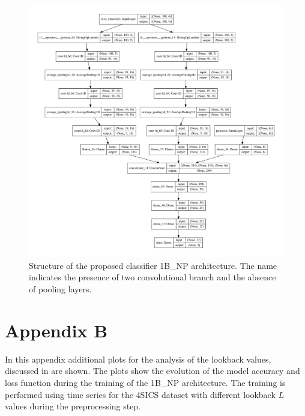 \begin{figure}
    \hspace{-2cm}\includegraphics[width=1.3\textwidth]{images/models/model_2bnp.pdf}
\caption{{Structure of the proposed classifier 1B\_NP architecture. The name indicates the presence of two convolutional branch and the absence of pooling layers.}}    \label{fig:2bnp_model}
\end{figure}




\chapter{Appendix B}
\label{app:lb_bonus_res}

In this appendix additional plots for the analysis of the lookback values, discussed in  are shown. The plots show the evolution of the model accuracy and loss function during the training of the 1B\_NP architecture. The training is performed using time series for the 4SICS dataset with different lookback $L$ values during the preprocessing step. 

